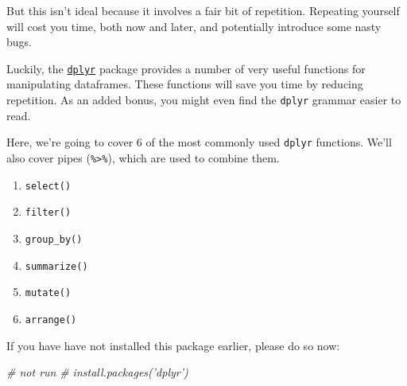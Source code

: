 \documentclass[]{book}
\newenvironment{Shaded}{\begin{snugshade}}{\end{snugshade}}
\newcommand{\CommentTok}[1]{\textcolor[rgb]{0.56,0.35,0.01}{\textit{#1}}}
\newcommand{\KeywordTok}[1]{\textcolor[rgb]{0.13,0.29,0.53}{\textbf{#1}}}
\newcommand{\NormalTok}[1]{#1}
\newcommand{\OperatorTok}[1]{\textcolor[rgb]{0.81,0.36,0.00}{\textbf{#1}}}
\newcommand{\StringTok}[1]{\textcolor[rgb]{0.31,0.60,0.02}{#1}}
\providecommand{\tightlist}{%
  \setlength{\itemsep}{0pt}\setlength{\parskip}{0pt}}
\begin{document}
\begin{Shaded}
\end{Shaded}

But this isn't ideal because it involves a fair bit of repetition. Repeating yourself will cost you time, both now and later, and potentially introduce some nasty bugs.

Luckily, the \href{https://cran.r-project.org/web/packages/dplyr/dplyr.pdf}{\texttt{dplyr}} package provides a number of very useful functions for manipulating dataframes. These functions will save you time by reducing repetition. As an added bonus, you might even find the \texttt{dplyr} grammar easier to read.

Here, we're going to cover 6 of the most commonly used \texttt{dplyr} functions. We'll also cover pipes (\texttt{\%\textgreater{}\%}), which are used to combine them.

\begin{enumerate}
\def\labelenumi{\arabic{enumi}.}
\tightlist
\item
  \texttt{select()}
\item
  \texttt{filter()}
\item
  \texttt{group\_by()}
\item
  \texttt{summarize()}
\item
  \texttt{mutate()}
\item
  \texttt{arrange()}
\end{enumerate}

If you have have not installed this package earlier, please do so now:

\begin{Shaded}
\begin{Highlighting}[]
\CommentTok{# not run}
\CommentTok{# install.packages('dplyr')}
\end{Highlighting}
\end{Shaded}
\end{document}
